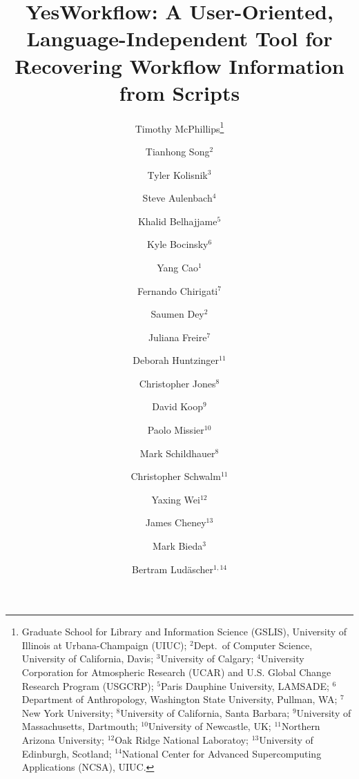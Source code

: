 \documentclass{article}
\newcommand{\YWT}{\textsf{YesWorkflow}}
\begin{document}

\title{\bf \YWT: A User-Oriented, Language-Independent Tool for Recovering Workflow Information from Scripts}

\author{
  Timothy McPhillips\footnote{Graduate School for Library and
    Information Science (GSLIS), University of Illinois at
    Urbana-Champaign (UIUC);
   $^2$Dept.\ of Computer Science, University of California, Davis;
   $^3$University of Calgary;
   $^4$University Corporation for Atmospheric Research (UCAR) and U.S.
   Global Change Research Program (USGCRP);
  $^5$Paris Dauphine University, LAMSADE;
  $^6$Department of Anthropology, Washington State University, Pullman, WA; 
  $^7$New York University;
  $^8$University of California, Santa Barbara;
  $^9$University of Massachusetts, Dartmouth;
  $^{10}$University of Newcastle, UK;
  $^{11}$Northern Arizona University;
  $^{12}$Oak Ridge National Laboratoy;
  $^{13}$University of Edinburgh, Scotland;
  $^{14}$National Center for Advanced Supercomputing
   Applications (NCSA), UIUC.} \and
  \and 
  Tianhong Song$^2$ \and
  Tyler Kolisnik$^3$ \and 
  Steve Aulenbach$^4$ \and 
  Khalid Belhajjame$^5$ \and
  Kyle Bocinsky$^6$ \and
  Yang Cao$^1$ \and 
  Fernando Chirigati$^7$ \and
  Saumen Dey$^2$ \and
  Juliana Freire$^7$ \and   
  Deborah Huntzinger$^{11}$ \and
  Christopher Jones$^8$  \and 
  David Koop$^9$ \and 
  Paolo Missier$^{10}$ \and 
  Mark Schildhauer$^8$ \and 
  Christopher Schwalm$^{11}$ \and
  Yaxing Wei$^{12}$ \and
   James Cheney$^{13}$ \and
  Mark Bieda$^3$ \and
  Bertram Lud\"ascher$^{1, 14}$
}

\date{\relax}

\maketitle
\end{document}
